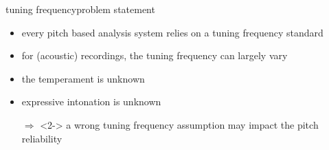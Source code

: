         \begin{frame}{tuning frequency}{problem statement}
            \begin{itemize}
                \item   every pitch based analysis system relies on a tuning frequency standard
                \item   for (acoustic) recordings, the tuning frequency can largely vary
                \item   the temperament is unknown
                \item   expressive intonation is unknown
                
                \bigskip
                
                \item[$\Rightarrow$]<2->   a wrong tuning frequency assumption may impact the pitch reliability
            \end{itemize}
        \end{frame}

